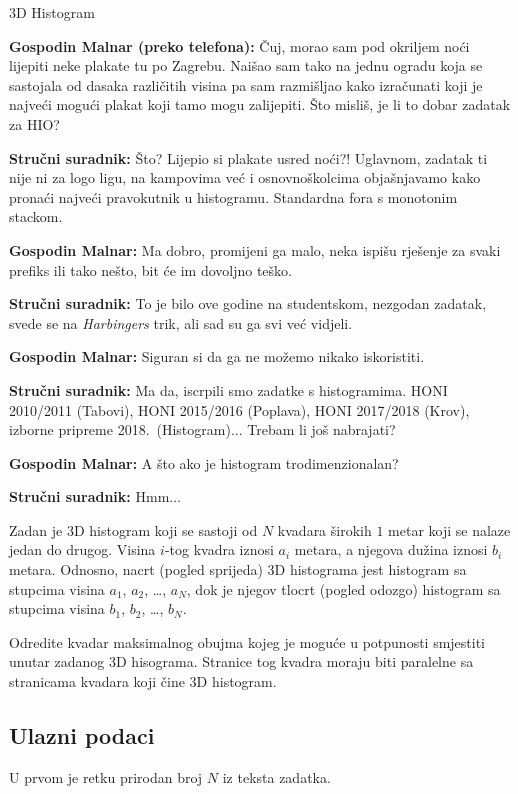 \begin{statement}[
  problempoints=100,
  timelimit=1 sekunda,
  memorylimit=512 MiB,
]{3D Histogram}

\textbf{Gospodin Malnar (preko telefona):} Čuj, morao sam pod okriljem noći
lijepiti neke plakate tu po Zagrebu. Naišao sam tako na jednu ogradu koja se
sastojala od dasaka različitih visina pa sam razmišljao kako izračunati koji
je najveći mogući plakat koji tamo mogu zalijepiti. Što misliš, je li to
dobar zadatak za HIO?

\textbf{Stručni suradnik:} Što? Lijepio si plakate usred noći?! Uglavnom,
zadatak ti nije ni za logo ligu, na kampovima već i osnovnoškolcima objašnjavamo
kako pronaći najveći pravokutnik u histogramu. Standardna fora s monotonim
stackom.

\textbf{Gospodin Malnar:} Ma dobro, promijeni ga malo, neka ispišu rješenje za
svaki prefiks ili tako nešto, bit će im dovoljno teško.

\textbf{Stručni suradnik:} To je bilo ove godine na studentskom, nezgodan
zadatak, svede se na \textit{Harbingers} trik, ali sad su ga svi već
vidjeli.

\textbf{Gospodin Malnar:} Siguran si da ga ne možemo nikako iskoristiti.

\textbf{Stručni suradnik:} Ma da, iscrpili smo zadatke s histogramima. HONI
  2010/2011 (Tabovi), HONI 2015/2016 (Poplava), HONI 2017/2018 (Krov), izborne
  pripreme 2018.\ (Histogram)... Trebam li još nabrajati?

\textbf{Gospodin Malnar:} A što ako je histogram trodimenzionalan?

\textbf{Stručni suradnik:} Hmm...

Zadan je 3D histogram koji se sastoji od $N$ kvadara širokih $1$ metar koji se
nalaze jedan do drugog. Visina $i$-tog kvadra iznosi $a_i$ metara, a njegova
dužina iznosi $b_i$ metara. Odnosno, nacrt (pogled sprijeda) 3D histograma
jest histogram sa stupcima visina $a_1$, $a_2$, \dots, $a_N$, dok je njegov
tlocrt (pogled odozgo) histogram sa stupcima visina $b_1$, $b_2$, \dots,
$b_N$.


Odredite kvadar maksimalnog obujma kojeg je moguće u potpunosti smjestiti unutar
zadanog 3D hisograma. Stranice tog kvadra moraju biti paralelne sa stranicama
kvadara koji čine 3D histogram.

\subsection*{Ulazni podaci}
U prvom je retku prirodan broj $N$ iz teksta zadatka.


\end{statement}
